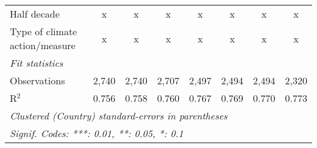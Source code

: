\begin{tabular}{lccccccc}
   Half decade                                                                     & x             & x             & x             & x             & x             & x            & x\\  
   Type of climate action/measure                                                  & x             & x             & x             & x             & x             & x            & x\\  
   \midrule \emph{Fit statistics}\\
   Observations                                                                    & 2,740         & 2,740         & 2,707         & 2,497         & 2,494         & 2,494        & 2,320\\  
   R$^2$                                                                           & 0.756         & 0.758         & 0.760         & 0.767         & 0.769         & 0.770        & 0.773\\  
   \midrule
   \multicolumn{8}{l}{\emph{Clustered (Country) standard-errors in parentheses}}\\
   \multicolumn{8}{l}{\emph{Signif. Codes: ***: 0.01, **: 0.05, *: 0.1}}\\
\end{tabular}
\par\endgroup


